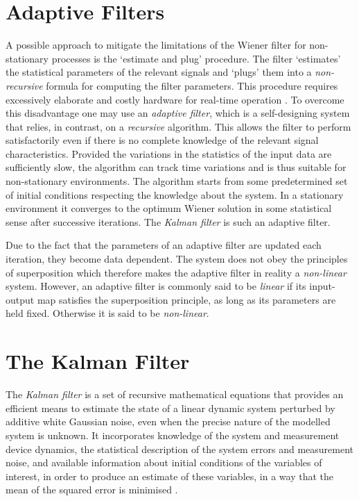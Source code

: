 \section{Adaptive Filters}

A possible approach to mitigate the limitations of the Wiener filter for non-stationary processes is the `estimate and plug' procedure. The filter `estimates' the statistical parameters of the relevant signals and `plugs' them into a \emph{non-recursive} formula for computing the filter parameters. This procedure requires excessively elaborate and costly hardware for real-time operation \cite{haykin2002adaptive}. To overcome this disadvantage one may use an \emph{adaptive filter}, which is a self-designing system that relies, in contrast, on a \emph{recursive} algorithm. This allows the filter to perform satisfactorily even if there is no complete knowledge of the relevant signal characteristics. Provided the variations in the  statistics of the input data are sufficiently slow, the algorithm can track time variations and is thus suitable for non-stationary environments. The algorithm starts from some predetermined set of initial conditions respecting the knowledge about the system. In a stationary environment it converges to the optimum Wiener solution in some statistical sense after successive iterations. The \emph{Kalman filter} is such an adaptive filter.

Due to the fact that the parameters of an adaptive filter are updated each iteration, they become data dependent. The system does not obey the principles of superposition which therefore makes the adaptive filter in reality a \emph{non-linear} system. However, an adaptive filter is commonly said to be \emph{linear} if its input-output map satisfies the superposition principle, as long as its parameters are held fixed. Otherwise it is said to be \emph{non-linear}.


\section{The Kalman Filter}

The \emph{Kalman filter} is a set of recursive mathematical equations that provides an efficient means to estimate the state of a linear dynamic system perturbed by additive white Gaussian noise, even when the precise nature of the modelled system is unknown. It incorporates knowledge of the system and measurement device dynamics, the statistical description of the system errors and measurement noise, and available information about initial conditions of the variables of interest, in order to produce an estimate of these variables, in a way that the mean of the squared error is minimised \cite{Maybeck79}. 

